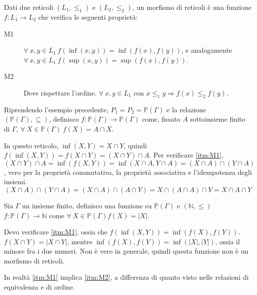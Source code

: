 \begin{defn}
Dati due reticoli $(L_1, \le_1)$ e $(L_2, \le_2)$, un morfismo di reticoli \`e una funzione $f : L_1 \to L_2$ che verifica le seguenti propriet\`a:
\begin{description}
  \item[M1\label{itm:M1}] $\forall \ x, y \in L_1 \ f(\inf(x,y)) = \inf(f(x),f(y))$, e analogamente $\forall \ x, y \in L_1 \ f(\sup(x,y)) = \sup(f(x),f(y))$.
  \item[M2\label{itm:M2}] Deve rispettare l'ordine. $\forall \ x, y \in L_1 $ con $x \le_1 y \Rightarrow f(x) \le_2 f(y)$.
\end{description}
\end{defn}

\begin{exmp}
Riprendendo l'esempio precedente, $P_1 = P_2 = \mathbb{P}(\Gamma)$ e la relazione $(\mathbb{P}(\Gamma), \subseteq)$, definisco $f : \mathbb{P}(\Gamma) \to \mathbb{P}(\Gamma)$ come, fissato $A$ sottoinsieme finito di $\Gamma$, $\forall \ X \in \mathbb{P}(\Gamma) \ f(X) = A \cap X$.

In questo reticolo, $\inf(X,Y) = X \cap Y$, quindi $f(\inf(X,Y)) = f(X \cap Y) = (X \cap Y) \cap A$. Per verificare \ref{itm:M1}, $(X \cap Y) \cap A = \inf(f(X,Y)) = \inf(X \cap A, Y \cap A) = (X \cap A) \cap (Y \cap A)$, vero per la propriet\`a commutativa, la propriet\`a associativa e l'idempotenza degli insiemi.
\[
(X \cap A) \cap (Y \cap A) = (X \cap A) \cap (A \cap Y) = X \cap (A \cap A) \cap Y = X \cap A \cap Y
\]
\end{exmp}

\begin{exmp}\label{morfismo_no_reticoli}
Sia $\Gamma$ un insieme finito, definisco una funzione su $\mathbb{P}(\Gamma)$ e $(\mathbb{N}, \le)$ $f : \mathbb{P}(\Gamma) \to \mathbb{N}$ come $\forall \ X \in \mathbb{P}(\Gamma) f(X) = |X|$.

Devo verificare \ref{itm:M1}, ossia che $f(\inf(X,Y)) = \inf(f(X),f(Y))$. $f(X \cap Y) = |X \cap Y|$, mentre $\inf(f(X),f(Y)) = \inf(|X|,|Y|)$, ossia il minore fra i due numeri. Non \`e vero in generale, quindi questa funzione non \`e un morfismo di reticoli.
\end{exmp}

In realt\`a \ref{itm:M1} implica \ref{itm:M2}, a differenza di quanto visto nelle relazioni di equivalenza e di ordine.

